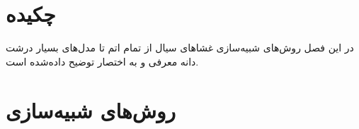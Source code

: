 \setRL
\clearpage

\def \MemSimRev {\Mempath /MembraneSimReview}

\section{
چکیده
}
در این فصل روش‌های شبیه‌سازی غشاهای سیال از تمام اتم تا مدل‌های بسیار درشت دانه‌ معرفی و به اختصار توضیح داده‌شده است.

\section{
روش‌های شبیه‌سازی
}

